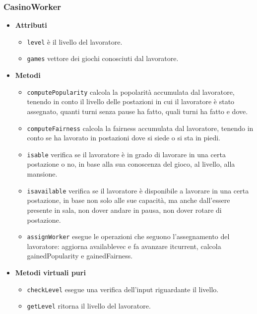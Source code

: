 \subsubsection{CasinoWorker}
\begin{itemize}
    \item \textbf{Attributi}
    \begin{itemize}
        \item \texttt{level} è il livello del lavoratore.
        \item \texttt{games} vettore dei giochi conosciuti dal lavoratore.
    \end{itemize}
    \item \textbf{Metodi}
    \begin{itemize}
        \item \texttt{computePopularity} calcola la popolarità accumulata dal lavoratore, tenendo in conto il livello delle postazioni in cui il lavoratore è stato assegnato, quanti turni senza pause ha fatto, quali turni ha fatto e dove.
        \item \texttt{computeFairness} calcola la fairness accumulata dal lavoratore, tenendo in conto se ha lavorato in postazioni dove si siede o si sta in piedi.
        \item \texttt{is\textunderscore able} verifica se il lavoratore è in grado di lavorare in una certa postazione o no, in base alla sua conoscenza del gioco, al livello, alla mansione.
        \item \texttt{is\textunderscore available} verifica se il lavoratore è disponibile a lavorare in una certa postazione, in base non solo alle sue capacità, ma anche dall'essere presente in sala, non dover andare in pausa, non dover rotare di postazione.
        \item \texttt{assignWorker} esegue le operazioni che seguono l'assegnamento del lavoratore: aggiorna available\textunderscore vec e fa avanzare it\textunderscore current, calcola gainedPopularity e gainedFairness.
    \end{itemize}
    \item \textbf{Metodi virtuali puri}
    \begin{itemize}
        \item \texttt{checkLevel} esegue una verifica dell'input riguardante il livello.
        \item \texttt{getLevel} ritorna il livello del lavoratore.
    \end{itemize}
\end{itemize}


